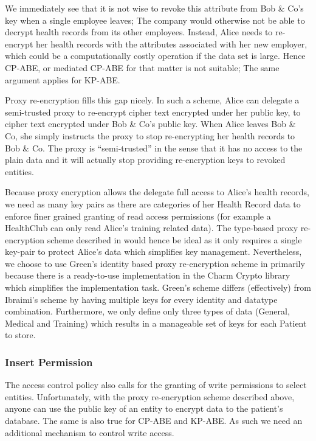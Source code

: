 \documentclass[]{article}
\begin{document}
\begin{itemize}
We immediately see that it is not wise to revoke this attribute from Bob \& Co's key when a single employee leaves; The company would otherwise not be able to decrypt health records from its other employees. Instead, Alice needs to re-encrypt her health records with the attributes associated with her new employer, which could be a computationally costly operation if the data set is large. Hence CP-ABE, or mediated CP-ABE for that matter is not suitable; The same argument applies for KP-ABE.

Proxy re-encryption fills this gap nicely. In such a scheme, Alice can delegate a semi-trusted proxy to re-encrypt cipher text encrypted under her public key, to cipher text encrypted under Bob \& Co's public key. When Alice leaves Bob \& Co, she simply instructs the proxy to stop re-encrypting her health records to Bob \& Co. The proxy is ``semi-trusted'' in the sense that it has no access to the plain data and it will actually stop providing re-encryption keys to revoked entities.

Because proxy encryption allows the delegate full access to Alice's health records, we need as many key pairs as there are categories of her Health Record data to enforce finer grained granting of read access permissions (for example a HealthClub can only read Alice's training related data). The type-based proxy re-encryption scheme described in \cite{ibraimi2008type} would hence be ideal as it only requires a single key-pair to protect Alice's data which simplifies key management. Nevertheless, we choose to use Green's identity based proxy re-encryption scheme in \cite{green2007identity} primarily because there is a ready-to-use implementation in the Charm Crypto library \cite{charm13} which simplifies the implementation task. Green's scheme differs (effectively) from Ibraimi's scheme by having multiple keys for every identity and datatype combination. Furthermore, we only define only three types of data (General, Medical and Training) which results in a manageable set of keys for each Patient to store.

\subsubsection{Insert Permission}
The access control policy also calls for the granting of write permissions to select entities. Unfortunately, with the proxy re-encryption scheme described above, anyone can use the public key of an entity to encrypt data to the patient's database. The same is also true for CP-ABE and KP-ABE. As such we need an additional mechanism to control write access.


\end{itemize}
\end{document}
